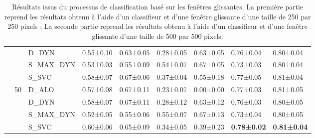 \begin{landscape}
\begin{table}[H]
\begin{tabular}{cclllllll}
							        &                                   & D\_DYN                    & 0.55±0.10         & 0.63±0.05     & 0.28±0.05         & 0.63±0.05     & 0.76±0.04         & 0.80±0.04         \\
							        &                                   & S\_MAX\_DYN               & 0.53±0.03         & 0.55±0.09     & 0.54±0.07         & 0.67±0.05     & 0.73±0.03         & 0.80±0.04         \\
							        &                                   & S\_SVC                    & 0.58±0.07         & 0.67±0.06     & 0.37±0.04         & 0.55±0.18     & 0.77±0.05         & 0.81±0.04         \\ \cline{2-9}
							        & \multirow{4}{*}{50}               & D\_ALO                    & 0.57±0.08         & 0.67±0.11     & 0.23±0.07         & 0.00±0.00     & 0.77±0.03         & 0.81±0.05         \\
							        &                                   & D\_DYN                    & 0.58±0.07         & 0.67±0.11     & 0.28±0.12         & 0.63±0.12     & 0.76±0.03         & 0.80±0.05         \\
							        &                                   & S\_MAX\_DYN               & 0.52±0.05         & 0.55±0.06     & 0.55±0.07         & 0.67±0.13     & 0.73±0.04         & 0.80±0.05         \\
		                            &                                   & S\_SVC                    & 0.60±0.06         & 0.65±0.09     & 0.34±0.05         & 0.39±0.23     & \textbf{0.78±0.02}& \textbf{0.81±0.04}\\
		\bottomrule
    \end{tabular}
    \label{tab:image_improvement_sliding_window}
    \caption{Résultats issus du processus de classification basé sur les fenêtres glissantes. La première partie reprend les résultats obtenu à l'aide d'un classifieur et d'une fenêtre glissante d'une taille de 250 par 250 pixels ; La seconde partie  reprend les résultats obtenu à l'aide d'un classifieur et d'une fenêtre glissante d'une taille de 500 par 500 pixels.}
\end{table}

\end{landscape}

